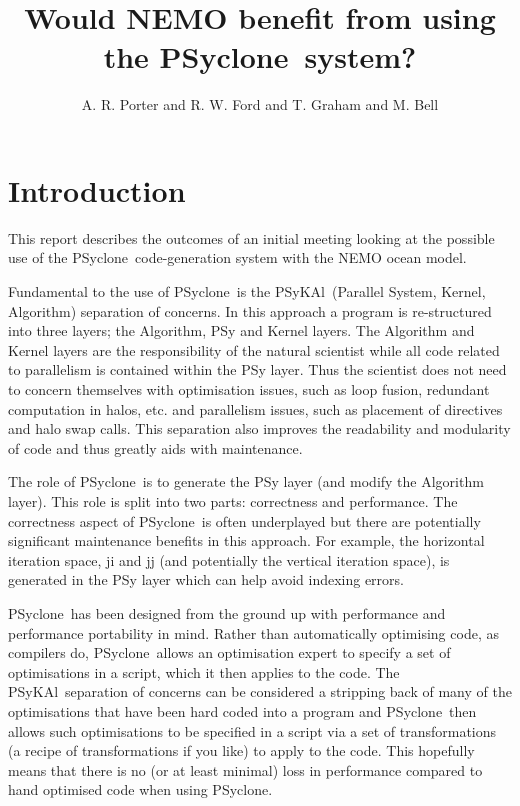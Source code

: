 \documentclass{article}
\newcommand{\psykal}{{PS}y{KA}l}
\newcommand{\psyclone}{{PS}yclone}
\begin{document}
\title{Would NEMO benefit from using the \psyclone\ system?}

\author{A. R. Porter and R. W. Ford and T. Graham and M. Bell}

\maketitle

\section{Introduction}

This report describes the outcomes of an initial meeting looking at
the possible use of the \psyclone\ code-generation system with the NEMO
ocean model.

Fundamental to the use of \psyclone\ is the \psykal\ (Parallel System,
Kernel, Algorithm) separation of concerns. In this approach a program
is re-structured into three layers; the Algorithm, PSy and Kernel
layers.  The Algorithm and Kernel layers are the responsibility of the
natural scientist while all code related to parallelism is contained
within the PSy layer. Thus the scientist does not need to concern
themselves with optimisation issues, such as loop fusion, redundant
computation in halos, etc. and parallelism issues, such as placement
of directives and halo swap calls. This separation also improves the
readability and modularity of code and thus greatly aids with
maintenance.


The role of \psyclone\ is to generate the PSy layer (and modify the
Algorithm layer). This role is split into two parts: correctness and
performance. The correctness aspect of \psyclone\ is often underplayed
but there are potentially significant maintenance benefits in this
approach. For example, the horizontal iteration space, ji and jj (and
potentially the vertical iteration space), is generated in the PSy
layer which can help avoid indexing errors.

\psyclone\ has been designed from the ground up with performance and
performance portability in mind. Rather than automatically optimising
code, as compilers do, \psyclone\ allows an optimisation expert to
specify a set of optimisations in a script, which it then applies to
the code. The \psykal\ separation of concerns can be considered a
stripping back of many of the optimisations that have been hard coded
into a program and \psyclone\ then allows such optimisations to be
specified in a script via a set of transformations (a recipe of
transformations if you like) to apply to the code. This hopefully
means that there is no (or at least minimal) loss in performance
compared to hand optimised code when using \psyclone.
\end{document}

